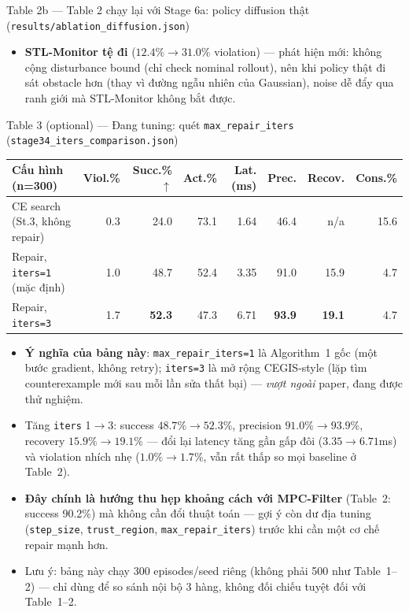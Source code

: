 \documentclass[aspectratio=169]{beamer}
\begin{document}
\begin{frame}[t,shrink=8]{Table 2b --- Table 2 chạy lại với Stage 6a: policy diffusion thật (\texttt{results/ablation\_diffusion.json})}
\begin{itemize}
    \item \textbf{STL-Monitor tệ đi} ($12.4\%\to31.0\%$ violation) --- phát hiện mới: không cộng disturbance bound (chỉ check nominal rollout), nên khi policy thật đi sát obstacle hơn (thay vì đường ngẫu nhiên của Gaussian), noise dễ đẩy qua ranh giới mà STL-Monitor không bắt được.
\end{itemize}
\end{frame}

\begin{frame}[t,shrink=8]{Table 3 (optional) --- Đang tuning: quét \texttt{max\_repair\_iters} (\texttt{stage34\_iters\_comparison.json})}
\scriptsize
\begin{center}
\begin{tabular}{@{}l r r r r r r r@{}}
\toprule
\textbf{Cấu hình (n=300)} & \textbf{Viol.\%} & \textbf{Succ.\%$\uparrow$} & \textbf{Act.\%} & \textbf{Lat.(ms)} & \textbf{Prec.} & \textbf{Recov.} & \textbf{Cons.\%} \\
\midrule
CE search (St.3, không repair) & 0.3 & 24.0 & 73.1 & 1.64 & 46.4 & n/a & 15.6 \\
Repair, \texttt{iters=1} (mặc định) & 1.0 & 48.7 & 52.4 & 3.35 & 91.0 & 15.9 & 4.7 \\
Repair, \texttt{iters=3} & 1.7 & \textbf{52.3} & 47.3 & 6.71 & \textbf{93.9} & \textbf{19.1} & 4.7 \\
\bottomrule
\end{tabular}
\end{center}
\vspace{8pt}
\begin{itemize}
    \item \textbf{Ý nghĩa của bảng này}: \texttt{max\_repair\_iters=1} là Algorithm~1 gốc (một bước gradient, không retry); \texttt{iters=3} là mở rộng CEGIS-style (lặp tìm counterexample mới sau mỗi lần sửa thất bại) --- \emph{vượt ngoài} paper, đang được thử nghiệm.
    \item Tăng \texttt{iters} 1$\to$3: success $48.7\%\to52.3\%$, precision $91.0\%\to93.9\%$, recovery $15.9\%\to19.1\%$ --- đổi lại latency tăng gần gấp đôi ($3.35\to6.71$ms) và violation nhích nhẹ ($1.0\%\to1.7\%$, vẫn rất thấp so mọi baseline ở Table~2).
    \item \textbf{Đây chính là hướng thu hẹp khoảng cách với MPC-Filter} (Table~2: success 90.2\%) mà không cần đổi thuật toán --- gợi ý còn dư địa tuning (\texttt{step\_size}, \texttt{trust\_region}, \texttt{max\_repair\_iters}) trước khi cần một cơ chế repair mạnh hơn.
    \item Lưu ý: bảng này chạy 300 episodes/seed riêng (không phải 500 như Table~1--2) --- chỉ dùng để so sánh nội bộ 3 hàng, không đối chiếu tuyệt đối với Table~1--2.
\end{itemize}
\end{frame}
\end{document}
